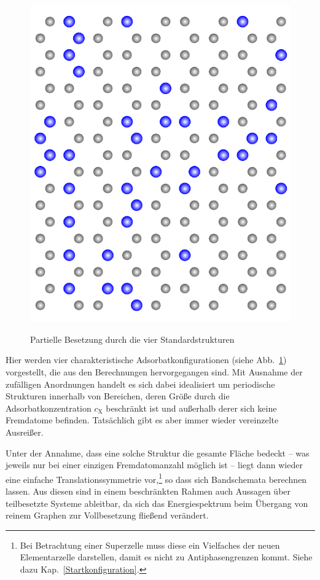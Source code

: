 \documentclass[a4paper, 10pt, twoside, openany]{book} %
\def \cX {c_\mathrm{X}}
\begin{document}
\begin{figure}
\begin{minipage}[b]{0.24\textwidth}
        \label{C6X-Insel}
    \end{minipage}
    \hfill
    \begin{minipage}[b]{0.24\textwidth}
        \includegraphics[width=\textwidth]{Abbildungen/random.pdf}
        \label{ungeordnet}
    \end{minipage}
    \caption{Partielle Besetzung durch die vier Standardstrukturen}
    \label{Standardkonfigurationen}
\end{figure}
%
Hier werden vier charakteristische Adsorbatkonfigurationen (siehe Abb.~\ref{Standardkonfigurationen}) vorgestellt, die aus den Berechnungen hervorgegangen sind. Mit Ausnahme der zufälligen Anordnungen handelt es sich dabei idealisiert um periodische Strukturen innerhalb von Bereichen, deren Größe durch die Adsorbatkonzentration $\cX$ beschränkt ist und außerhalb derer sich keine Fremdatome befinden. Tatsächlich gibt es aber immer wieder vereinzelte Ausreißer.

Unter der Annahme, dass eine solche Struktur die gesamte Fläche bedeckt -- was jeweils nur bei einer einzigen Fremdatomanzahl möglich ist -- liegt dann wieder eine einfache Translationssymmetrie vor,\footnote{Bei Betrachtung einer Superzelle muss diese ein Vielfaches der neuen Elementarzelle darstellen, damit es nicht zu Antiphasengrenzen kommt. Siehe dazu Kap.~\ref{Startkonfiguration}.} so dass sich Bandschemata berechnen lassen. Aus diesen sind in einem beschränkten Rahmen auch Aussagen über teilbesetzte Systeme ableitbar, da sich das Energiespektrum beim Übergang von reinem Graphen zur Vollbesetzung fließend verändert.
\end{document}
